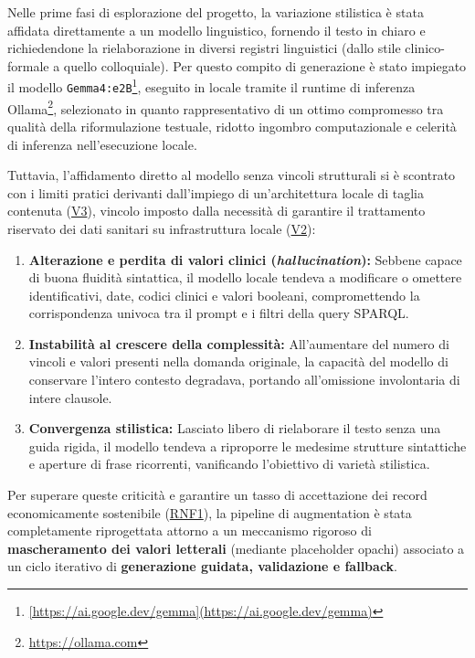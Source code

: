 \documentclass[12pt,a4paper,openright,twoside]{book}
\begin{document}
Nelle prime fasi di esplorazione del progetto, la variazione stilistica è stata
affidata direttamente a un modello linguistico, fornendo il testo in chiaro e
richiedendone la rielaborazione in diversi registri linguistici (dallo stile
clinico-formale a quello colloquiale). Per questo compito di generazione è stato
impiegato il modello
\texttt{Gemma4:e2B}\footnote{\url{[https://ai.google.dev/gemma](https://ai.google.dev/gemma)}},
eseguito in locale tramite il runtime di inferenza
Ollama\footnote{\url{https://ollama.com}}, selezionato in quanto rappresentativo
di un ottimo compromesso tra qualità della riformulazione testuale, ridotto
ingombro computazionale e celerità di inferenza nell'esecuzione locale.

Tuttavia, l'affidamento diretto al modello senza vincoli strutturali si è
scontrato con i limiti pratici derivanti dall'impiego di un'architettura locale
di taglia contenuta (\hyperref[vinc:V3]{V3}), vincolo imposto dalla necessità di
garantire il trattamento riservato dei dati sanitari su infrastruttura locale
(\hyperref[vinc:V2]{V2}):

\begin{enumerate}
    \item \textbf{Alterazione e perdita di valori clinici
              (\textit{hallucination}):} Sebbene capace di buona fluidità
          sintattica, il modello locale tendeva a modificare o omettere
          identificativi, date, codici clinici e valori booleani,
          compromettendo la corrispondenza univoca tra il prompt e i filtri
          della query SPARQL.
    \item \textbf{Instabilità al crescere della complessità:} All'aumentare del
          numero di vincoli e valori presenti nella domanda originale, la
          capacità del modello di conservare l'intero contesto degradava,
          portando all'omissione involontaria di intere clausole.
    \item \textbf{Convergenza stilistica:} Lasciato libero di rielaborare il
          testo senza una guida rigida, il modello tendeva a riproporre le
          medesime strutture sintattiche e aperture di frase ricorrenti,
          vanificando l'obiettivo di varietà stilistica.
\end{enumerate}

Per superare queste criticità e garantire un tasso di accettazione dei record
economicamente sostenibile (\hyperref[rnf:RNF1]{RNF1}), la pipeline di
augmentation è stata completamente riprogettata attorno a un meccanismo rigoroso
di \textbf{mascheramento dei valori letterali} (mediante placeholder opachi)
associato a un ciclo iterativo di \textbf{generazione guidata, validazione e
    fallback}.
\end{document}
